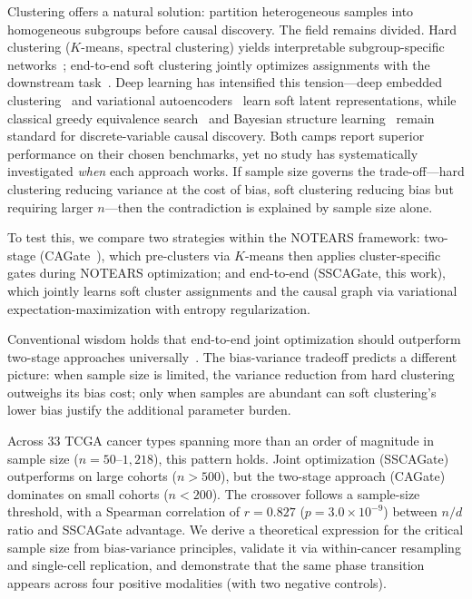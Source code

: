 \documentclass[12pt,a4paper]{article}
\begin{document}
Clustering offers a natural solution: partition heterogeneous samples into homogeneous subgroups before causal discovery. The field remains divided. Hard clustering ($K$-means, spectral clustering) yields interpretable subgroup-specific networks~\cite{jain2010data, macqueen1967classification}; end-to-end soft clustering jointly optimizes assignments with the downstream task~\cite{blei2003lda, vonluxburg2007tutorial, dempster1977em}. Deep learning has intensified this tension---deep embedded clustering~\cite{xie2016dec} and variational autoencoders~\cite{kingma2014vae} learn soft latent representations, while classical greedy equivalence search~\cite{chickering2002optimal} and Bayesian structure learning~\cite{heckerman1995bayesian} remain standard for discrete-variable causal discovery. Both camps report superior performance on their chosen benchmarks, yet no study has systematically investigated \emph{when} each approach works. If sample size governs the trade-off---hard clustering reducing variance at the cost of bias, soft clustering reducing bias but requiring larger $n$---then the contradiction is explained by sample size alone.

To test this, we compare two strategies within the NOTEARS framework: two-stage (CAGate~\cite{gao2026cagate}), which pre-clusters via $K$-means then applies cluster-specific gates during NOTEARS optimization; and end-to-end (SSCAGate, this work), which jointly learns soft cluster assignments and the causal graph via variational expectation-maximization with entropy regularization.

Conventional wisdom holds that end-to-end joint optimization should outperform two-stage approaches universally~\cite{strehl2002cluster, jain2010data}. The bias-variance tradeoff predicts a different picture: when sample size is limited, the variance reduction from hard clustering outweighs its bias cost; only when samples are abundant can soft clustering's lower bias justify the additional parameter burden.

Across 33 TCGA cancer types spanning more than an order of magnitude in sample size ($n = 50$--$1{,}218$), this pattern holds. Joint optimization (SSCAGate) outperforms on large cohorts ($n > 500$), but the two-stage approach (CAGate) dominates on small cohorts ($n < 200$). The crossover follows a sample-size threshold, with a Spearman correlation of $r = 0.827$ ($p = 3.0 \times 10^{-9}$) between $n/d$ ratio and SSCAGate advantage. We derive a theoretical expression for the critical sample size from bias-variance principles, validate it via within-cancer resampling and single-cell replication, and demonstrate that the same phase transition appears across four positive modalities (with two negative controls).
\end{document}
